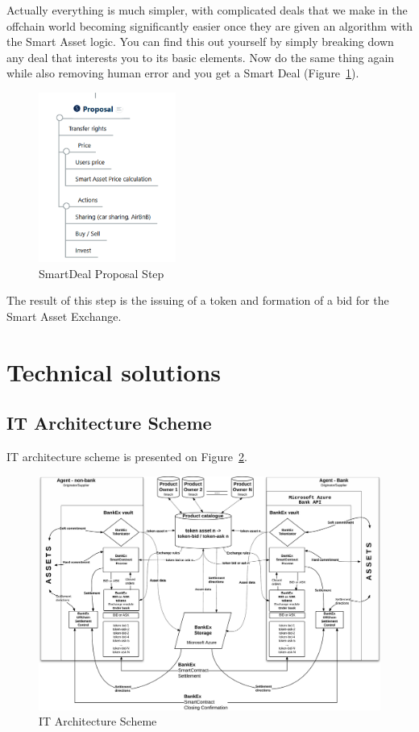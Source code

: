 \documentclass{article}
\begin{document}
\begin{multicols}{2}
Actually everything is much simpler, with complicated deals that we make in the offchain world becoming significantly easier once they are given an algorithm with the Smart Asset logic. You can find this out yourself by simply breaking down any deal that interests you  to its basic elements. Now do the same thing again while also removing human error and you get a Smart Deal (Figure~\ref{fig:proposal}).

\begin{figure}
  \centering
  \includegraphics[width=0.4\textwidth]{proposal.png}
  \caption{SmartDeal Proposal Step}
  \label{fig:proposal}
\end{figure}

The result of this step is the issuing of a token and formation of a bid for the Smart Asset Exchange.

\section{Technical solutions}

\subsection{IT Architecture Scheme}

IT architecture scheme is presented on Figure~\ref{fig:it-architecture}.

\begin{figure}
  \centering
  \includegraphics[width=\textwidth]{it-architecture.pdf}
  \caption{IT Architecture Scheme}
  \label{fig:it-architecture}
\end{figure}


\end{multicols}
\end{document}
